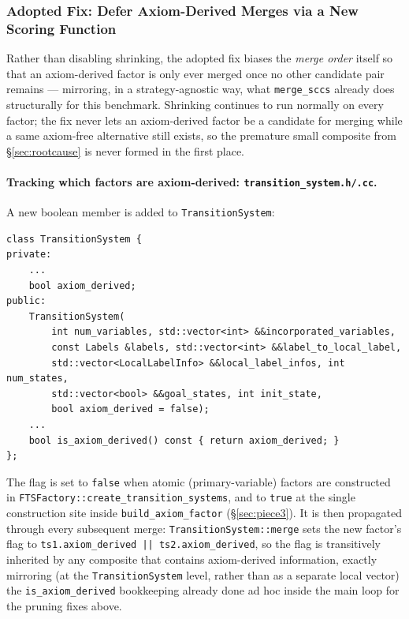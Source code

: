 \documentclass[11pt,a4paper]{article}
\begin{document}
\subsubsection{Adopted Fix: Defer Axiom-Derived Merges via a New Scoring Function}
\label{sec:axiomdeferral}

Rather than disabling shrinking, the adopted fix biases the \emph{merge
order} itself so that an axiom-derived factor is only ever merged once no
other candidate pair remains --- mirroring, in a strategy-agnostic way, what
\texttt{merge\_sccs} already does structurally for this benchmark. Shrinking
continues to run normally on every factor; the fix never lets an
axiom-derived factor be a candidate for merging while a same axiom-free
alternative still exists, so the premature small composite from
\S\ref{sec:rootcause} is never formed in the first place.

\paragraph{Tracking which factors are axiom-derived: \texttt{transition\_system.h/.cc}.}
A new boolean member is added to \texttt{TransitionSystem}:
\begin{lstlisting}
class TransitionSystem {
private:
    ...
    bool axiom_derived;
public:
    TransitionSystem(
        int num_variables, std::vector<int> &&incorporated_variables,
        const Labels &labels, std::vector<int> &&label_to_local_label,
        std::vector<LocalLabelInfo> &&local_label_infos, int num_states,
        std::vector<bool> &&goal_states, int init_state,
        bool axiom_derived = false);
    ...
    bool is_axiom_derived() const { return axiom_derived; }
};
\end{lstlisting}
The flag is set to \texttt{false} when atomic (primary-variable) factors are
constructed in \texttt{FTSFactory::create\_transition\_systems}, and to
\texttt{true} at the single construction site inside
\texttt{build\_axiom\_factor} (\S\ref{sec:piece3}). It is then propagated
through every subsequent merge: \texttt{TransitionSystem::merge} sets the
new factor's flag to \texttt{ts1.axiom\_derived || ts2.axiom\_derived}, so
the flag is transitively inherited by any composite that contains
axiom-derived information, exactly mirroring (at the \texttt{TransitionSystem}
level, rather than as a separate local vector) the \texttt{is\_axiom\_derived}
bookkeeping already done ad hoc inside the main loop for the pruning fixes
above.
\end{document}
